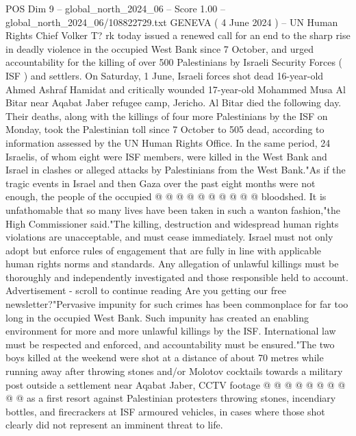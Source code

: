 \begin{textsample}{POS Dim 9 – global\_north\_2024\_06 – Score 1.00 – global\_north\_2024\_06/108822729.txt}  \label{ex:f9_pos_284}
GENEVA ( 4 June 2024 ) -- UN Human Rights Chief Volker T? rk today issued a renewed call for an end to the sharp rise in deadly violence in the occupied West Bank since 7 October, and urged accountability for the killing of over 500 Palestinians by Israeli Security Forces ( ISF ) and settlers.
On Saturday, 1 June, Israeli forces shot dead 16-year-old Ahmed Ashraf Hamidat and critically wounded 17-year-old Mohammed Musa Al Bitar near Aqabat Jaber refugee camp, Jericho.
Al Bitar died the following day.
Their deaths, along with the killings of four more Palestinians by the ISF on Monday, took the Palestinian toll since 7 October to 505 dead, according to information assessed by the UN Human Rights Office.
In the same period, 24 Israelis, of whom eight were ISF members, were killed in the West Bank and Israel in clashes or alleged attacks by Palestinians from the West Bank."As if the tragic events in Israel and then Gaza over the past eight months were not enough, the people of the occupied @ @ @ @ @ @ @ @ @ @ bloodshed.
It is unfathomable that so many lives have been taken in such a wanton fashion,"the High Commissioner said."The killing, destruction and widespread human rights violations are unacceptable, and must cease immediately.
Israel must not only adopt but enforce rules of engagement that are fully in line with applicable human rights norms and standards.
Any allegation of unlawful killings must be thoroughly and independently investigated and those responsible held to account.
Advertisement - scroll to continue reading Are you getting our free newsletter?"Pervasive impunity for such crimes has been commonplace for far too long in the occupied West Bank.
Such impunity has created an enabling environment for more and more unlawful killings by the ISF.
International law must be respected and enforced, and accountability must be ensured."The two boys killed at the weekend were shot at a distance of about 70 metres while running away after throwing stones and/or Molotov cocktails towards a military post outside a settlement near Aqabat Jaber, CCTV footage @ @ @ @ @ @ @ @ @ @ as a first resort against Palestinian protesters throwing stones, incendiary bottles, and firecrackers at ISF armoured vehicles, in cases where those shot clearly did not represent an imminent threat to life.

\end{textsample}
